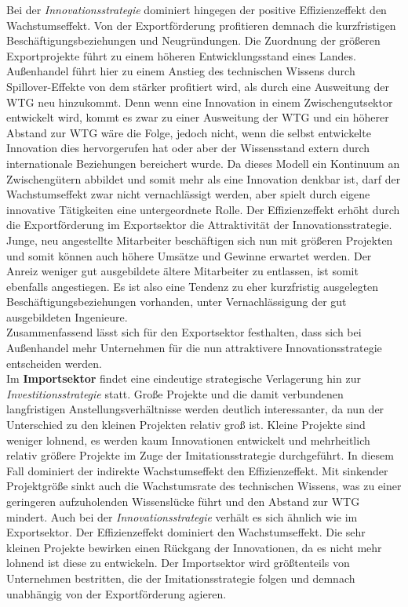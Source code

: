 Bei der \textit{Innovationsstrategie} dominiert hingegen der positive Effizienzeffekt den Wachstumseffekt. Von der Exportförderung profitieren demnach die kurzfristigen Beschäftigungsbeziehungen und Neugründungen. Die Zuordnung der größeren Exportprojekte führt zu einem höheren Entwicklungsstand eines Landes. Außenhandel führt hier zu einem Anstieg des technischen Wissens durch Spillover-Effekte von dem stärker profitiert wird, als durch eine Ausweitung der WTG neu hinzukommt. Denn wenn eine Innovation in einem Zwischengutsektor entwickelt wird, kommt es zwar zu einer Ausweitung der WTG und ein höherer Abstand zur WTG wäre die Folge, jedoch nicht, wenn die selbst entwickelte Innovation dies hervorgerufen hat oder aber der Wissensstand extern durch internationale Beziehungen bereichert wurde. Da dieses Modell ein Kontinuum an Zwischengütern abbildet und somit mehr als eine Innovation denkbar ist, darf der Wachstumseffekt zwar nicht vernachlässigt werden, aber spielt durch eigene innovative Tätigkeiten eine untergeordnete Rolle. Der Effizienzeffekt erhöht durch die Exportförderung im Exportsektor die Attraktivität der Innovationsstrategie. Junge, neu angestellte Mitarbeiter beschäftigen sich nun mit größeren Projekten und somit können auch höhere Umsätze und Gewinne erwartet werden. Der Anreiz weniger gut ausgebildete ältere Mitarbeiter zu entlassen, ist somit ebenfalls angestiegen. Es ist also eine Tendenz zu eher kurzfristig ausgelegten Beschäftigungsbeziehungen vorhanden, unter Vernachlässigung der gut ausgebildeten Ingenieure.\\


Zusammenfassend lässt sich für den Exportsektor festhalten, dass sich bei Außenhandel mehr Unternehmen für die nun attraktivere Innovationsstrategie entscheiden werden.\\


Im \textbf{Importsektor} findet eine eindeutige strategische Verlagerung hin zur \textit{Investitionsstrategie} statt. Große Projekte und die damit verbundenen langfristigen Anstellungsverhältnisse werden deutlich interessanter, da nun der Unterschied zu den kleinen Projekten relativ groß ist. Kleine Projekte sind weniger lohnend, es werden kaum Innovationen entwickelt und mehrheitlich relativ größere Projekte im Zuge der Imitationsstrategie durchgeführt. In diesem Fall dominiert der indirekte Wachstumseffekt den Effizienzeffekt. Mit sinkender Projektgröße sinkt auch die Wachstumsrate des technischen Wissens, was zu einer geringeren aufzuholenden Wissenslücke führt und den Abstand zur WTG mindert. Auch bei der \textit{Innovationsstrategie} verhält es sich ähnlich wie im Exportsektor. Der Effizienzeffekt dominiert den Wachstumseffekt. Die sehr kleinen Projekte bewirken einen Rückgang der Innovationen, da es nicht mehr lohnend ist diese zu entwickeln. Der Importsektor wird größtenteils von Unternehmen bestritten, die der Imitationsstrategie folgen und demnach unabhängig von der Exportförderung agieren. \\


